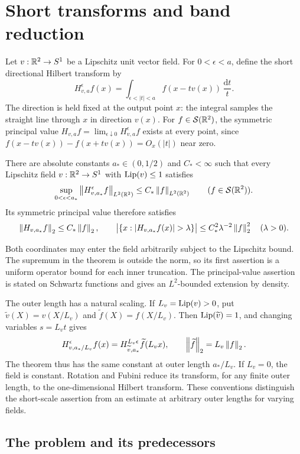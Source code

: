 \section{Short transforms and band reduction}
\label{intro:section}

Let \(v:\mathbb R^2\to S^1\) be a Lipschitz unit vector field. For
\(0<\epsilon<a\), define the short directional Hilbert transform by
\[
 H_{v,a}^{\epsilon}f(x)
 =\int_{\epsilon<|t|<a}f(x-tv(x))\,\frac{\mathrm dt}{t}.
\]
The direction is held fixed at the output point \(x\): the integral
samples the straight line through \(x\) in direction \(v(x)\).
For \(f\in\mathcal S(\mathbb R^2)\), the symmetric principal value
\(H_{v,a}f=\lim_{\epsilon\downarrow0}H_{v,a}^{\epsilon}f\)
exists at every point, since
\(f(x-tv(x))-f(x+tv(x))=O_x(|t|)\) near zero.

\begin{theorem}\label{thm:main}
There are absolute constants \(a_*\in(0,1/2)\) and \(C_*<\infty\)
such that every Lipschitz field \(v:\mathbb R^2\to S^1\) with
\(\operatorname{Lip}(v)\le1\) satisfies
\[
 \sup_{0<\epsilon<a_*}
 \left\|H_{v,a_*}^{\epsilon}f\right\|_{L^2(\mathbb R^2)}
 \le C_*\left\|f\right\|_{L^2(\mathbb R^2)}
 \qquad(f\in\mathcal S(\mathbb R^2)).
\]
Its symmetric principal value therefore satisfies
\[
 \norm{H_{v,a_*}f}_2\le C_*\norm f_2,
 \qquad
 \big|\{x:|H_{v,a_*}f(x)|>\lambda\}\big|
 \le C_*^2\lambda^{-2}\norm f_2^2
 \quad(\lambda>0).
\]
\end{theorem}

Both coordinates may enter the field arbitrarily subject to the
Lipschitz bound. The supremum in the theorem is outside the norm,
so its first assertion is a uniform operator bound for each inner
truncation. The principal-value assertion is stated on Schwartz
functions and gives an \(L^2\)-bounded extension by density.

The outer length has a natural scaling. If \(L_v=\operatorname{Lip}(v)>0\), put
\(\widetilde v(X)=v(X/L_v)\) and
\(\widetilde f(X)=f(X/L_v)\). Then \(\operatorname{Lip}(\widetilde v)=1\), and
changing variables \(s=L_vt\) gives
\[
 H_{v,a_*/L_v}^{\epsilon}f(x)
 =H_{\widetilde v,a_*}^{L_v\epsilon}\widetilde f(L_vx),
 \qquad \left\|\widetilde f\right\|_2=L_v\left\|f\right\|_2.
\]
The theorem thus has the same constant at outer length \(a_*/L_v\).
If \(L_v=0\), the field is constant. Rotation and Fubini reduce its
transform, for any finite outer length, to the one-dimensional
Hilbert transform. These conventions distinguish the short-scale
assertion from an estimate at arbitrary outer lengths for varying
fields.

\subsection{The problem and its predecessors}

